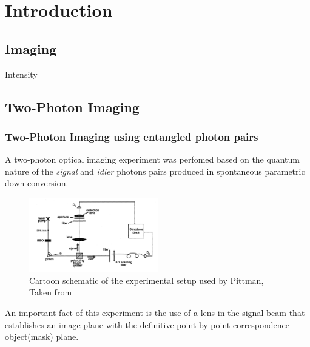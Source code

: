
\chapter{Introduction} %

\label{Chapter1} %


\section{Imaging}
Intensity \cite{physicsGhost}

\section{Two-Photon Imaging}

\subsection{Two-Photon Imaging using entangled photon pairs}
A two-photon optical imaging experiment was perfomed based on the quantum nature of the \textit{signal} and \textit{idler}
photons pairs produced in spontaneous parametric down-conversion\cite{pittman}.
\begin{figure}[h]
\centering
\includegraphics[width=0.5\textwidth]{Figures/pittman.png}
\caption{Cartoon schematic of the experimental setup used by Pittman, Taken from \cite{pittman}} 
\label{fig:pittman}
\end{figure}
An important fact of this experiment is the use of a lens in the signal beam that establishes an image plane with the definitive point-by-point correspondence object(mask) plane.




